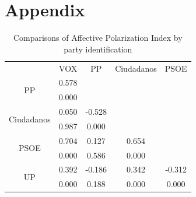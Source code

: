 \documentclass[a4paper, svgnames]{article}
\begin{document}

\newpage




\newpage

\section*{Appendix}

\begin{table}[H]
	\centering
	\caption{Comparisons of Affective Polarization Index by party identification}
	\label{tab:anova-parties}
	\begin{tabular}{@{}ccccc@{}}
		\toprule
		\multirow{2}{*}{}           & \multirow{2}{*}{VOX} & \multirow{2}{*}{PP} & \multirow{2}{*}{Ciudadanos} & \multirow{2}{*}{PSOE} \\
		                            &                      &                     &                             &                       \\ \midrule
		\multirow{2}{*}{PP}         & 0.578                &                     &                             &                       \\
		                            & 0.000                &                     &                             &                       \\
		\multirow{2}{*}{Ciudadanos} & 0.050                & -0.528              &                             &                       \\
		                            & 0.987                & 0.000               &                             &                       \\
		\multirow{2}{*}{PSOE}       & 0.704                & 0.127               & 0.654                       &                       \\
		                            & 0.000                & 0.586               & 0.000                       &                       \\
		\multirow{2}{*}{UP}         & 0.392                & -0.186              & 0.342                       & -0.312                \\
		                            & 0.000                & 0.188               & 0.000                       & 0.000                 \\ \bottomrule
	\end{tabular}
\end{table}
\end{document}
